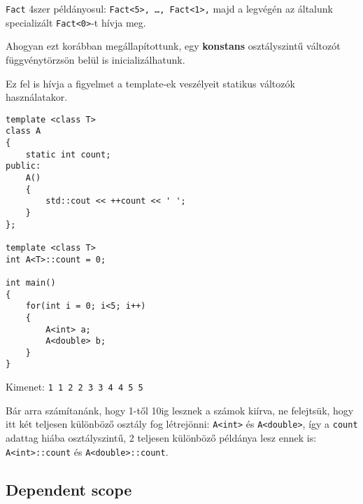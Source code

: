 \documentclass[a4paper,11.5pt,table]{article}
\begin{document}
	\texttt{Fact} 4szer példányosul: \texttt{Fact<5>, \ldots, Fact<1>,} majd a legvégén az általunk specializált \texttt{Fact<0>}-t hívja meg.
	\begin{note}
		Ahogyan ezt korábban megállapítottunk, egy \textbf{konstans} osztályszintű változót függvénytörzsön belül is inicializálhatunk.
	\end{note}
	Ez fel is hívja a figyelmet a template-ek veszélyeit statikus változók használatakor.
	
	\begin{lstlisting}
template <class T>
class A
{
	static int count;
public:
	A()
	{
		std::cout << ++count << ' ';
	}
};

template <class T>
int A<T>::count = 0;

int main() 
{
	for(int i = 0; i<5; i++)
	{
		A<int> a;
		A<double> b;
	}
}
	\end{lstlisting}
	Kimenet: \texttt{1 1 2 2 3 3 4 4 5 5}
	
	Bár arra számítanánk, hogy 1-től 10ig lesznek a számok kiírva, ne felejtsük, hogy itt két teljesen különböző osztály fog létrejönni: \texttt{A<int>} és \texttt{A<double>}, így a \texttt{count} adattag hiába osztályszintű, 2 teljesen különböző példánya lesz ennek is: \texttt{A<int>::count} és \texttt{A<double>::count}.
	
	\subsection{Dependent scope}
	
\end{document}
